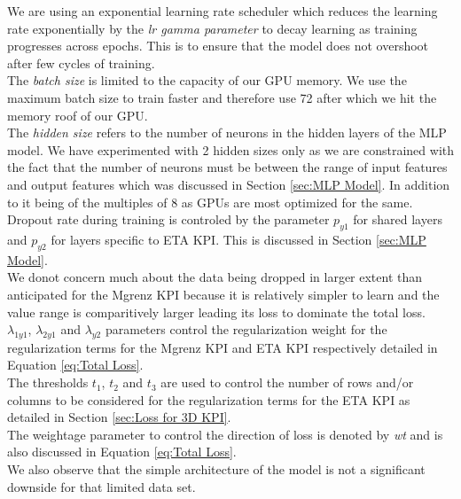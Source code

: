 \documentclass{report} %
\begin{document}
We are using an exponential learning rate scheduler which reduces the learning rate exponentially by the \textit{lr gamma parameter} to decay learning as training progresses across epochs.
This is to ensure that the model does not overshoot after few cycles of training.\\
The \textit{batch size} is limited to the capacity of our \ac{GPU} memory. We use the maximum batch size to train faster and therefore use 72 after which we hit the memory roof of our GPU.\\
The \textit{hidden size} refers to the number of neurons in the hidden layers of the \ac{MLP} model. 
We have experimented with 2 hidden sizes only as we are constrained with the fact that the number of neurons must be between the range of input features and output features which was discussed in Section \ref{sec:MLP Model}.
In addition to it being of the multiples of 8 as \ac{GPU}s are most optimized for the same.
Dropout rate during training is controled by the parameter \textit{$p_{y1}$} for shared layers and \textit{$p_{y2}$} for layers specific to ETA \ac{KPI}. This is discussed in Section \ref{sec:MLP Model}. \\
We donot concern much about the data being dropped in larger extent than anticipated for the Mgrenz \ac{KPI} because it is relatively simpler to learn and the value range is comparitively larger leading its loss to dominate the total loss.\\
\textit{$\lambda_{1y1}$}, \textit{$\lambda_{2y1}$} and \textit{$\lambda_{y2}$} parameters control the regularization weight for the regularization terms for the Mgrenz \ac{KPI} and ETA \ac{KPI} respectively detailed in Equation \ref{eq:Total Loss}.\\
The thresholds \textit{$t_{1}$}, \textit{$t_{2}$} and \textit{$t_{3}$} are used to control the number of rows and/or columns to be considered for the regularization terms for the ETA \ac{KPI} as detailed in Section \ref{sec:Loss for 3D KPI}.\\
The weightage parameter to control the direction of loss is denoted by \textit{wt} and is also discussed in Equation \ref{eq:Total Loss}.\\

We also observe that the simple architecture of the model is not a significant downside for that limited data set. \\
\end{document}
